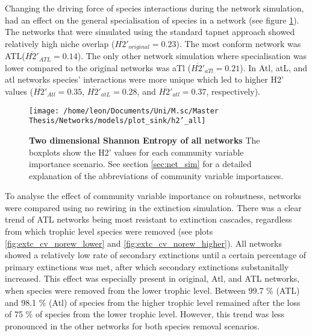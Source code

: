 \documentclass[12pt,a4paper]{article}
\begin{document}
Changing the driving force of species interactions during the network simulation, had an effect on the general specialisation of species in a network (see figure \ref{fig:h2}). The networks that were simulated using the standard tapnet approach showed relatively high niche overlap ($ \overline{H2'}_{original} = 0.23 $). The most conform network was ATL($ \overline{H2'}_{ATL} = 0.14 $). The only other network simulation where specialisation was lower compared to the original networks was aTl ($ \overline{H2'}_{aTl} = 0.21 $). In Atl, atL, and atl networks species' interactions were more unique which led to higher H2' values ($ \overline{H2'}_{Atl} = 0.35 $, $ \overline{H2'}_{atL} = 0.28 $, and $ \overline{H2'}_{atl} = 0.37 $, respectively).
\begin{figure}[h]
	 \texttt{[image: /home/leon/Documents/Uni/M.sc/Master Thesis/Networks/models/plot\_sink/h2'\_all]}
	 \caption{\textbf{Two dimensional Shannon Entropy of all networks} The boxplots show the H2' values for each community variable importance scenario. See section \ref{sec:net_sim} for a detailed explanation of the abbreviations of community variable importances.}
	 \label{fig:h2}
\end{figure}

To analyse the effect of community variable importance on robustness, networks were compared using no rewiring in the extinction simulation. There was a clear trend of ATL networks being most resistant to extinction cascades, regardless from which trophic level species were removed (see plots \ref{fig:extc_cv_norew_lower} and \ref{fig:extc_cv_norew_higher}). All networks showed a relatively low rate of secondary extinctions until a certain percentage of primary extinctions was met, after which secondary extinctions substanitally increased. This effect was especially present in original, Atl, and ATL networks, when species were removed from the lower trophic level.  Between 99.7 \% (ATL) and 98.1 \% (Atl) of species from the higher trophic level remained after the loss of 75 \% of species from the lower trophic level. However, this trend was less pronounced in the other networks for both species removal scenarios. \par
\end{document}
